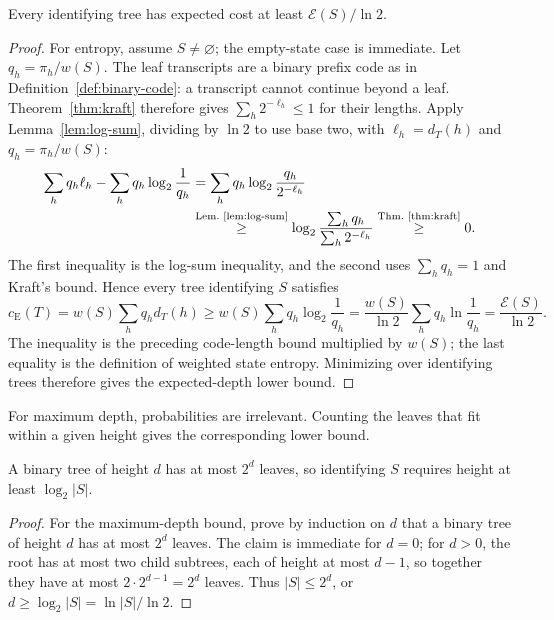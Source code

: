 \begin{claim}
\label{clm:restriction-2}
Every identifying tree has expected cost at least $\mathcal E(S)/\ln2$.
\end{claim}
\begin{proof}
For entropy, assume $S\ne\varnothing$; the empty-state case is
immediate. Let $q_h=\pi_h/w(S)$. The leaf transcripts are a binary
prefix code as in Definition~\ref{def:binary-code}: a transcript
cannot continue beyond a leaf. Theorem~\ref{thm:kraft} therefore
gives $\sum_h2^{-\ell_h}\le1$ for their lengths.
Apply Lemma~\ref{lem:log-sum}, dividing by $\ln2$ to use base two, with
$\ell_h=d_T(h)$ and $q_h=\pi_h/w(S)$:
\[
 \begin{aligned}
 \sum_h q_h\ell_h-\sum_hq_h\log_2\frac1{q_h}
 &=\sum_hq_h\log_2\frac{q_h}{2^{-\ell_h}}\\
 &\byref{Lem.}{lem:log-sum}{\ge}\log_2\frac{\sum_hq_h}{\sum_h2^{-\ell_h}}
 \byref{Thm.}{thm:kraft}{\ge}0.
 \end{aligned}
\]
The first inequality is the log-sum inequality, and the second uses
$\sum_hq_h=1$ and Kraft's bound. Hence every tree identifying $S$
satisfies
\[
 c_{\mathrm E}(T)=w(S)\sum_hq_hd_T(h)
 \ge w(S)\sum_hq_h\log_2\frac1{q_h}
 =\frac{w(S)}{\ln2}\sum_hq_h\ln\frac1{q_h}
 =\frac{\mathcal E(S)}{\ln2}.
\]
The inequality is the preceding code-length bound multiplied by
$w(S)$; the last equality is the definition of weighted state
entropy. Minimizing over identifying trees therefore gives the
expected-depth lower bound.

\end{proof}

For maximum depth, probabilities are irrelevant. Counting the leaves
that fit within a given height gives the corresponding lower bound.

\begin{claim}
\label{clm:restriction-3}
A binary tree of height $d$ has at most $2^d$ leaves, so identifying $S$ requires height at least $\log_2|S|$.
\end{claim}
\begin{proof}
For the maximum-depth bound, prove by induction on $d$ that a binary
tree of height $d$ has at most $2^d$ leaves. The claim is immediate
for $d=0$; for $d>0$, the root has at most two child subtrees, each
of height at most $d-1$, so together they have at most
$2\cdot2^{d-1}=2^d$ leaves. Thus $|S|\le2^d$, or
$d\ge\log_2|S|=\ln|S|/\ln2$.
\end{proof}



